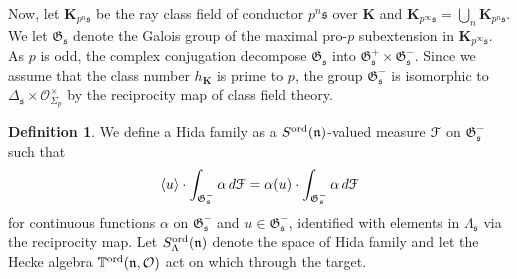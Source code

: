 \documentclass[leqno]{amsart}
\theoremstyle{definition}
\newtheorem{defn}[thm]{Definition}
\theoremstyle{remark}
\newcommand{\oo}{\mathcal{O}}
\newcommand{\fs}{\mathfrak{s}}
\newcommand{\fn}{\mathfrak{n}}
\newcommand{\K}{{\mathbf{K}}} %
\newcommand{\fG}{\mathfrak{G}}
\newcommand{\TT}{\mathbb{T}} %
\newcommand{\euF}{\EuScript{F}} %
\newcommand{\ord}{\textnormal{ord}} %
\begin{document}
Now, let $\K_{p^n\fs}$ be the ray class field of conductor 
$p^n\fs$ over $\K$ and 
$\K_{p^\infty\fs}=\bigcup_{n}\K_{p^n\fs}$.
We let $\fG_{\fs}$ denote
the Galois group of the maximal pro-$p$ 
subextension in $\K_{p^\infty\fs}$.
As $p$ is odd, the complex conjugation
decompose  $\fG_{\fs}$ into
$\fG_{\fs}^+\times\fG_{\fs}^-$.
Since we assume that the class number 
$h_\K$ is prime to  $p$,
the group $\fG_{\fs}^-$
is isomorphic to 
$\Delta_{\fs}\times \oo_{\Sigma_p}^\times$ 
by the reciprocity map of class field theory.

\begin{defn}
We define a Hida family as a 
$S^{\ord}(\fn)$-valued measure $\euF$ on $\fG_{\fs}^-$
such that 
\begin{equation}\label{def:Hida_family}
	\langle u\rangle \cdot 
	\int_{\fG_{\fs}^-}\alpha\,d\euF=
	\alpha(u)\cdot \int_{\fG_{\fs}^-}\alpha\,d\euF
\end{equation}
for continuous functions $\alpha$ on  $\fG_{\fs}^-$
and $u\in \fG_{\fs}^{-}$, 
identified with elements in $\Lambda_{\fs}$
via the reciprocity map.
Let $S^\ord_\Lambda(\fn)$
denote the space of Hida family
and let the Hecke algebra
$\TT^{\ord}(\fn,\oo)$
act on which through the target.
\end{defn}
\end{document}
